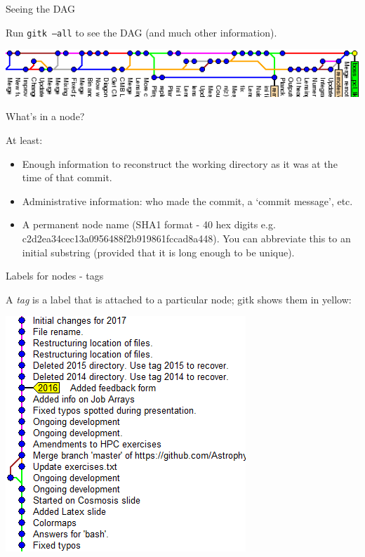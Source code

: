 \documentclass[usenames,dvipsnames]{beamer}
\newcommand{\code}[1]{\colorbox{light-gray}{\texttt{#1}}}
\begin{document}
\begin{frame}{Seeing the DAG}
  \begin{block}{}
  Run \code{gitk --all} to see the DAG (and much other information).
    \begin{center}
      \includegraphics[scale=0.8]{DAG.png}
    \end{center}
  \end{block}
\end{frame}


\begin{frame}{What's in a node?}
  \begin{block}{}
    At least:
    \begin{itemize}
      \item{Enough information to reconstruct the working directory as it was at the time of that commit.}
      \item{Administrative information: who made the commit, a `commit message', etc.}
      \item{A permanent node name (SHA1 format - 40 hex digits e.g. c2d2ea34cec13a0956488f2b919861fccad8a448). You can abbreviate this to an initial substring (provided that it is long enough to be unique).}
    \end{itemize}
  \end{block}
\end{frame}

\begin{frame}{Labels for nodes - tags}
  \begin{block}{}
    A \textit{tag} is a label that is attached to a particular node; gitk shows them in yellow:
    \begin{center}
      \includegraphics[scale=0.6]{Tag.png}
    \end{center}
  \end{block}
\end{frame}
  
\end{document}
